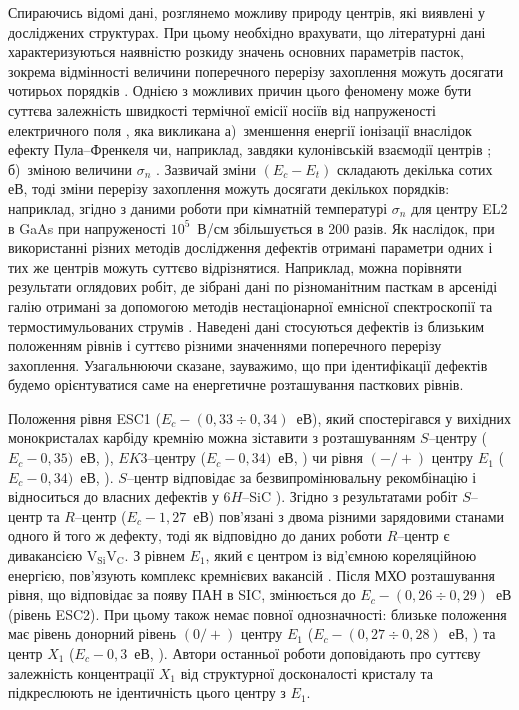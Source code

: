 Спираючись відомі дані, розглянемо можливу природу центрів,
які виявлені у досліджених структурах.
При цьому необхідно врахувати, що літературні дані характеризуються наявністю розкиду значень основних параметрів
пасток, зокрема відмінності величини поперечного перерізу захоплення можуть досягати чотирьох порядків \cite{Pavlovic2000}.
Однією з можливих причин цього феномену може бути суттєва залежність швидкості термічної емісії носіїв від
напруженості електричного поля  \cite{Bulyarskii2000r,Makram,Shishiyanu},
яка викликана
а)~зменшення енергії іонізації внаслідок ефекту Пула--Френкеля чи, наприклад,
завдяки кулонівській взаємодії центрів \cite{Stellmacher};
б)~зміною величини $\sigma_n$ \cite{Shishiyanu,Bourgoin2001}.
Зазвичай зміни $(E_c-E_t)$ складають декілька сотих еВ, тоді
зміни перерізу захоплення можуть досягати декількох порядків:
наприклад, згідно з даними роботи \cite{Bourgoin2001}  при кімнатній температурі $\sigma_n$ для центру EL2 в GaAs при напруженості $10^5$~В/см збільшується в 200 разів.
Як наслідок, при використанні різних методів дослідження дефектів отримані параметри одних і тих же центрів
можуть суттєво відрізнятися.
Наприклад, можна порівняти результати оглядових робіт, де зібрані дані по різноманітним пасткам в арсеніді галію отримані за допомогою методів нестаціонарної емнісної спектроскопії \cite{Bourgoin:GaAs} та
термостимульованих струмів \cite{Pavlovic2000}.
Наведені дані стосуються дефектів із близьким положенням рівнів і суттєво різними значеннями поперечного перерізу захоплення.
Узагальнюючи сказане, зауважимо, що при ідентифікації дефектів будемо орієнтуватися саме на енергетичне розташування
пасткових рівнів.


Положення рівня ESC1 ($E_c-(0,33\div0,34)$~еВ), який спостерігався у вихідних монокристалах карбіду кремнію
можна зіставити з розташуванням $S$--центру ($E_c-0,35)$~еВ, \cite{Lebed1999,Anikin1991:2,Anikin1991:3}),
$EK3$--центру ($E_c-0,34)$~еВ, \cite{Kuznets1997}) чи рівня $(-/+)$ центру $E_1$ ($E_c-0,34)$~еВ, \cite{Lebed1999}).
$S$--центр відповідає за безвипромінювальну рекомбінацію і відноситься до власних дефектів у 6$H$--SiC \cite{Lebed1999}).
Згідно з результатами робіт \cite{Anikin1991:2,Anikin1991:3} $S$--центр та $R$--центр ($E_c-1,27$~еВ) пов'язані
з двома різними зарядовими станами одного й того ж дефекту, тоді як відповідно до даних роботи \cite{Lebedev2000}
$R$--центр є дивакансією V$_\text{Si}$V$_\text{C}$.
З рівнем $E_1$, який є центром із від'ємною кореляційною енергією,
пов'язують комплекс кремнієвих вакансій  \cite{Lebedev2001}.
Після МХО розташування рівня, що відповідає за появу ПАН в SIC, змінюється до $E_c-(0,26\div0,29)$~еВ (рівень ESC2).
При цьому також немає повної однозначності:
близьке положення має рівень донорний рівень $(0/+)$ центру $E_1$ ($E_c-(0,27\div0,28)$~еВ, \cite{Hemmingsson})
та центр $X_1$ ($E_c-0,3$~еВ, \cite{Lebedev2001}).
Автори останньої роботи доповідають про суттєву залежність концентрації $X_1$ від структурної
досконалості кристалу та підкреслюють не ідентичність цього центру  з  $E_1$.

